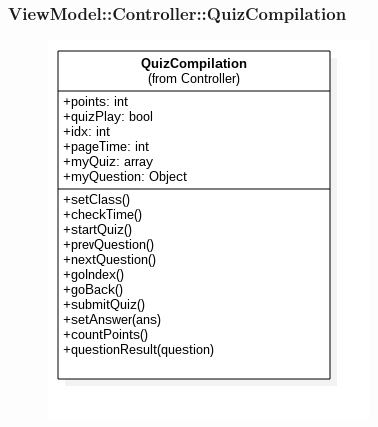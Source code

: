  \subsubsection{ViewModel::Controller::QuizCompilation}
 \begin{figure}[h!]
\begin{center}
	\includegraphics[scale=0.6]{../images/ViewModel/Controller/QuizCompilation.png}
\end{center}
\end{figure}
